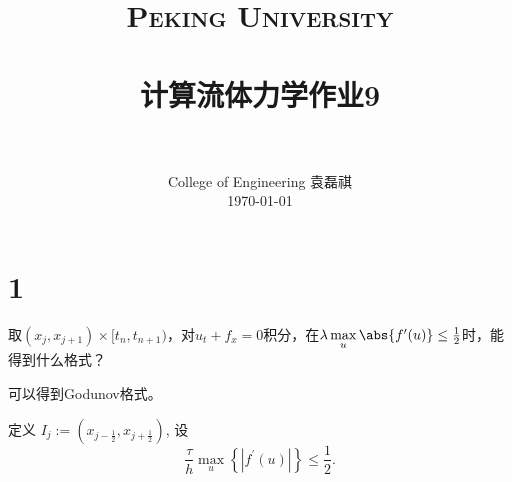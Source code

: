 \documentclass[12pt]{article}
\title{
		\vspace{-1in} 	
		\usefont{OT1}{bch}{b}{n}
		\normalfont \normalsize \textsc{\LARGE Peking University}\\[0.2cm] %
		\horrule{0.5pt} \\[0.2cm]
		\huge \bfseries{计算流体力学作业9} \\[-0.2cm]
		\horrule{2pt} \\[0.2cm]
}
\author{
		\normalfont 								\normalsize
		College of Engineering \quad 2001111690  \quad 袁磊祺\\	\normalsize
        \today
}
\date{}
\begin{document}


\maketitle

\section{1}

取$(x_j,x_{j+1})\times [t_n,t_{n+1})$，对$u_t+f_x=0$积分，在$\lambda \max \limits_{u} \abs{f'(u)} \leq \frac{1}{2}$时，能得到什么格式？

可以得到Godunov格式。

定义 $I_{j}:=\left(x_{j-\frac{1}{2}}, x_{j+\frac{1}{2}}\right)$, 设
\begin{equation}
	\frac{\tau}{h} \max _{u}\left\{\left|f^{\prime}(u)\right|\right\} \leq \frac{1}{2}.
	\label{eq:11}
\end{equation}
\end{document}
